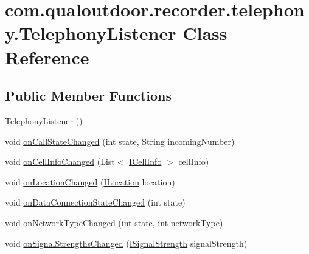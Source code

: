 \hypertarget{classcom_1_1qualoutdoor_1_1recorder_1_1telephony_1_1TelephonyListener}{\section{com.\-qualoutdoor.\-recorder.\-telephony.\-Telephony\-Listener Class Reference}
\label{classcom_1_1qualoutdoor_1_1recorder_1_1telephony_1_1TelephonyListener}
}
\subsection*{Public Member Functions}
\begin{DoxyCompactItemize}
\item 
\hyperlink{classcom_1_1qualoutdoor_1_1recorder_1_1telephony_1_1TelephonyListener_a3d14b9a5603d15201ffef86df42d54f1}{Telephony\-Listener} ()
\item 
void \hyperlink{classcom_1_1qualoutdoor_1_1recorder_1_1telephony_1_1TelephonyListener_a171849910c348658f639011099980d84}{on\-Call\-State\-Changed} (int state, String incoming\-Number)
\item 
void \hyperlink{classcom_1_1qualoutdoor_1_1recorder_1_1telephony_1_1TelephonyListener_ab93e4cd769a3efeedf3d4bd65de8ad15}{on\-Cell\-Info\-Changed} (List$<$ \hyperlink{interfacecom_1_1qualoutdoor_1_1recorder_1_1telephony_1_1ICellInfo}{I\-Cell\-Info} $>$ cell\-Info)
\item 
void \hyperlink{classcom_1_1qualoutdoor_1_1recorder_1_1telephony_1_1TelephonyListener_a671048ccc7d961591b47ce714d660436}{on\-Location\-Changed} (\hyperlink{interfacecom_1_1qualoutdoor_1_1recorder_1_1telephony_1_1ILocation}{I\-Location} location)
\item 
void \hyperlink{classcom_1_1qualoutdoor_1_1recorder_1_1telephony_1_1TelephonyListener_a8b3ff94c072f2d90dc82ae38d390bf62}{on\-Data\-Connection\-State\-Changed} (int state)
\item 
void \hyperlink{classcom_1_1qualoutdoor_1_1recorder_1_1telephony_1_1TelephonyListener_aa5f922c9142ab0e8c933a1953b384269}{on\-Network\-Type\-Changed} (int state, int network\-Type)
\item 
void \hyperlink{classcom_1_1qualoutdoor_1_1recorder_1_1telephony_1_1TelephonyListener_a560acb91a9cb03ad4e4389cc9393c76b}{on\-Signal\-Strengths\-Changed} (\hyperlink{interfacecom_1_1qualoutdoor_1_1recorder_1_1telephony_1_1ISignalStrength}{I\-Signal\-Strength} signal\-Strength)
\end{DoxyCompactItemize}
